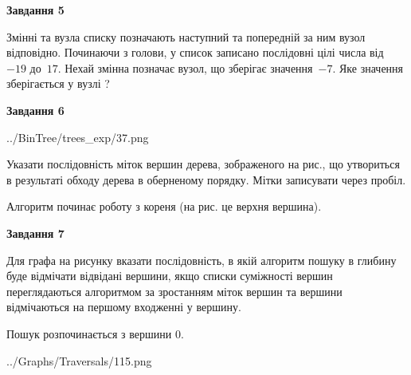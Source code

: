 \documentclass[12pt, ukrainian]{article}
\begin{document}
{\begin {large}
{\begin {center}\textbf{Завдання 5}\end {center}}\par
Змінні  та  вузла списку позначають наступний та попередній за ним вузол відповідно. Починаючи з голови, у список записано послідовні цілі числа від~$-19$ до~$17$. Нехай змінна  позначає вузол, що зберігає значення~$-7$.
Яке значення зберігається у вузлі  ?\par
\newpage

{\begin {center}\textbf{Завдання 6}\end {center}}\par

\begin{center}
	{../BinTree/trees_exp/37.png}
\end{center}
Указати послідовність міток вершин дерева, зображеного на рис., що утвориться в результаті обходу дерева в оберненому порядку. Мітки записувати через пробіл.\par Алгоритм починає роботу з кореня (на рис. це верхня вершина).\par
\newpage

{\begin {center}\textbf{Завдання 7}\end {center}}\par
Для графа на рисунку вказати послідовність, в якій алгоритм пошуку в глибину буде відмічати відвідані вершини, якщо списки суміжності вершин переглядаються алгоритмом за зростанням міток вершин та вершини відмічаються на першому вход\-женні у вершину.\par
Пошук розпочинається з вершини 0.\par

\begin{center}
	{../Graphs/Traversals/115.png}
\end{center}\par
\newpage


\end{large}}
\end{document}
